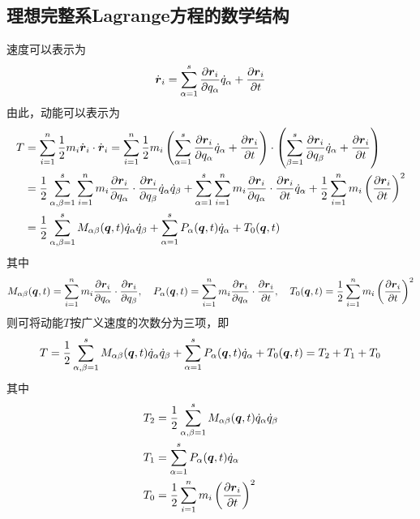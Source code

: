 \subsection{理想完整系Lagrange方程的数学结构}

速度可以表示为
\begin{equation*}
	\dot{\boldsymbol{r}}_i = \sum_{\alpha=1}^s \frac{\partial \boldsymbol{r}_i}{\partial q_\alpha} \dot{q}_\alpha + \frac{\partial \boldsymbol{r}_i}{\partial t}
\end{equation*}
由此，动能可以表示为
\begin{align*}
	T & = \sum_{i=1}^n \frac12 m_i \dot{\boldsymbol{r}}_i \cdot \dot{\boldsymbol{r}}_i = \sum_{i=1}^n \frac12 m_i \left(\sum_{\alpha=1}^s \frac{\partial \boldsymbol{r}_i}{\partial q_\alpha} \dot{q}_\alpha + \frac{\partial \boldsymbol{r}_i}{\partial t}\right) \cdot \left(\sum_{\beta=1}^s \frac{\partial \boldsymbol{r}_i}{\partial q_\beta} \dot{q}_\alpha + \frac{\partial \boldsymbol{r}_i}{\partial t}\right) \\
	& = \frac12 \sum_{\alpha,\beta=1}^s \sum_{i=1}^n m_i \frac{\partial \boldsymbol{r}_i}{\partial q_\alpha} \cdot \frac{\partial \boldsymbol{r}_i}{\partial q_\beta} \dot{q}_\alpha \dot{q}_\beta + \sum_{\alpha=1}^s \sum_{i=1}^n m_i \frac{\partial \boldsymbol{r}_i}{\partial q_\alpha} \cdot \frac{\partial \boldsymbol{r}_i}{\partial t} \dot{q}_\alpha + \frac12 \sum_{i=1}^n m_i \left(\frac{\partial \boldsymbol{r}_i}{\partial t}\right)^2 \\
	& = \frac12 \sum_{\alpha,\beta=1}^s M_{\alpha\beta}(\boldsymbol{q},t) \dot{q}_\alpha \dot{q}_\beta + \sum_{\alpha=1}^s P_\alpha(\boldsymbol{q},t) \dot{q}_\alpha + T_0(\boldsymbol{q},t)
\end{align*}
其中
\begin{equation*}
	M_{\alpha\beta}(\boldsymbol{q},t) = \sum_{i=1}^n m_i \frac{\partial \boldsymbol{r}_i}{\partial q_\alpha} \cdot \frac{\partial \boldsymbol{r}_i}{\partial q_\beta},\quad P_\alpha(\boldsymbol{q},t) = \sum_{i=1}^n m_i \frac{\partial \boldsymbol{r}_i}{\partial q_\alpha} \cdot \frac{\partial \boldsymbol{r}_i}{\partial t},\quad T_0(\boldsymbol{q},t) = \frac12 \sum_{i=1}^n m_i \left(\frac{\partial \boldsymbol{r}_i}{\partial t}\right)^2
\end{equation*}
则可将动能$T$按广义速度的次数分为三项，即
\begin{equation}
	T = \frac12 \sum_{\alpha,\beta=1}^s M_{\alpha\beta}(\boldsymbol{q},t) \dot{q}_\alpha \dot{q}_\beta + \sum_{\alpha=1}^s P_\alpha(\boldsymbol{q},t) \dot{q}_\alpha + T_0(\boldsymbol{q},t) = T_2 + T_1 + T_0
	\label{动能的数学结构}
\end{equation}
其中
\begin{align*}
	T_2 & = \frac12 \sum_{\alpha,\beta=1}^s M_{\alpha\beta}(\boldsymbol{q},t) \dot{q}_\alpha \dot{q}_\beta \\
	T_1 & = \sum_{\alpha=1}^s P_\alpha(\boldsymbol{q},t) \dot{q}_\alpha \\
	T_0 & = \frac12 \sum_{i=1}^n m_i \left(\frac{\partial \boldsymbol{r}_i}{\partial t}\right)^2
\end{align*}

